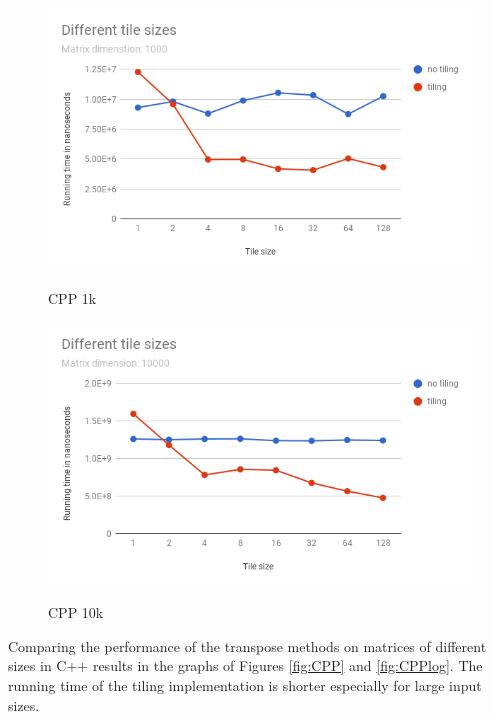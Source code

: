\documentclass[
    12pt,
    a4paper,
    oneside, 
    headinclude,footinclude,
    BCOR5mm,
]{scrartcl}
\begin{document}
\begin{figure}
\includegraphics[scale=0.5]{figures/CPPdifTile1000.png}
\label{fig:CPP1k}
\caption{CPP 1k}

\end{figure}

\begin{figure}
\includegraphics[scale=0.5]{figures/CPPdifTile10000.png}
\label{fig:CPP10k}
\caption{CPP 10k}

\end{figure}

Comparing the performance of the transpose methods on matrices of different sizes in C++ results in the graphs of Figures \ref{fig:CPP} and \ref{fig:CPPlog}.
The running time of the tiling implementation is shorter especially for large input sizes.
\end{document}
